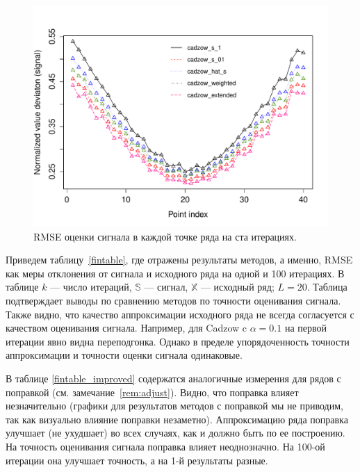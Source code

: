 \documentclass[12pt,a4paper,fleqn,leqno]{article}
\newcommand{\tsS}{\mathbb{S}}
\newcommand{\tsX}{\mathbb{X}}
\begin{document}
\begin{figure}[!hhh]
\begin{center}
\includegraphics[width = 13cm]{s1_it100.pdf}
\caption{RMSE оценки сигнала в каждой точке ряда на ста итерациях.}
\label{fig:s1_it100}
\end{center}
\end{figure}

Приведем таблицу~\ref{fintable}, где отражены результаты методов, а именно, RMSE как меры отклонения от сигнала и исходного ряда на одной и 100 итерациях.
В таблице $k$ --- число итераций, $\tsS$ --- сигнал, $\tsX$ --- исходный ряд; $L=20$. Таблица подтверждает выводы по сравнению методов по точности
оценивания сигнала. Также видно, что качество аппроксимации исходного ряда не всегда согласуется с качеством оценивания сигнала.
Например, для Cadzow c $\alpha=0.1$ на первой итерации явно видна переподгонка. Однако в пределе упорядоченность точности аппроксимации
и точности оценки сигнала одинаковые.

В таблице \ref{fintable_improved} содержатся аналогичные измерения для рядов с поправкой (см. замечание~\ref{rem:adjust}).
Видно, что поправка влияет незначительно (графики для результатов методов с поправкой мы не приводим, так как визуально влияние поправки незаметно). Аппроксимацию ряда поправка улучшает (не ухудшает) во всех случаях,
как и должно быть по ее построению. На точность оценивания сигнала поправка влияет неоднозначно. На 100-ой итерации она улучшает точность,
а на 1-й результаты разные.
\end{document}
